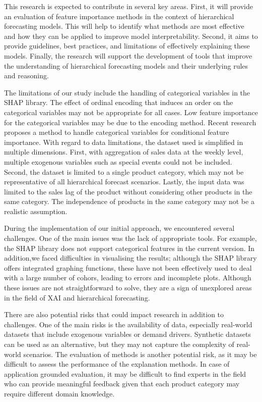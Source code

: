 This research is expected to contribute in several key areas.
First, it will provide an evaluation of feature importance methods in the context of hierarchical forecasting models.
This will help to identify what methods are most effective and how they can be applied to improve model interpretability.
Second, it aims to provide guidelines, best practices, and limitations of effectively explaining these models.
Finally, the research will support the development of tools that improve the understanding of hierarchical forecasting models
and their underlying rules and reasoning.


The limitations of our study include the handling of categorical variables in the SHAP library.
The effect of ordinal encoding that induces an order on the categorical variables may not be appropriate for all cases.
Low feature importance for the categorical variables may be due to the encoding method.
Recent research \cite{kristin_blesch_conditional_2023} proposes a method to handle categorical variables for conditional feature importance.
With regard to data limitations, the dataset used is simplified in multiple dimensions.
First, with aggregation of sales data at the weekly level, multiple exogenous variables such as special events could not be included.
Second, the dataset is limited to a single product category, which may not be representative of all hierarchical forecast scenarios.
Lastly, the input data was limited to the sales lag of the product without considering other products in the same category.
The independence of products in the same category may not be a realistic assumption.

During the implementation of our initial approach, we encountered several challenges.
One of the main issues was the lack of appropriate tools.
For example, the SHAP library does not support categorical features in the current version.
In addition,we faced difficulties in visualising the results;
although the SHAP library offers integrated graphing functions, these have not been effectively used to deal with
a large number of cohors, leading to errors and incomplete plots.
Although these issues are not straightforward to solve, they are a sign of unexplored areas in the field of XAI and hierarchical forecasting.

There are also potential risks that could impact research in addition to challenges.
One of the main risks is the availability of data, especially real-world datasets that include exogenous variables or demand drivers.
Synthetic datasets can be used as an alternative, but they may not capture the complexity of real-world scenarios.
The evaluation of methods is another potential risk, as it may be difficult to assess the performance of the explanation methods.
In case of application grounded evaluation, it may be difficult to find experts in the field who can provide meaningful feedback
given that each product category may require different domain knowledge\cite{doshi}.

